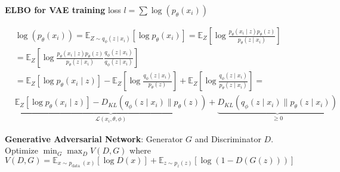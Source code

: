 \textbf{ELBO for VAE training} loss $l=\sum \log \left(p_{\theta}\left(x_{i}\right)\right)$
\begin{tiny}
    \begin{equation*}
        \begin{aligned}
             & \log \left(p_{\theta}\left(x_{i}\right)\right)=\mathbb{E}_{Z \sim q_{\phi}\left(z \mid x_{i}\right)}\left[\log p_{\theta}\left(x_{i}\right)\right] = \mathbb{E}_{Z}\left[\log \frac{p_{\theta}\left(x_{i} \mid z\right) p_{\theta}(z)}{p_{\theta}\left(z \mid x_{i}\right)}\right]                                                                                                                                                                                                                                                                                                                      \\
             & = \mathbb{E}_{Z}\left[\log \frac{p_{\theta}\left(x_{i} \mid z\right) p_{\theta}(z)}{p_{\theta}\left(z \mid x_{i}\right)} \frac{q_{\phi}\left(z \mid x_{i}\right)}{q_{\phi}\left(z \mid x_{i}\right)}\right]                                                                                                                                                                                                                                                                                                                                                                                             \\
             & = \mathbb{E}_{Z}\left[\log p_{\theta}\left(x_{i} \mid z\right)\right] -\mathbb{E}_{Z}\left[\log \frac{q_{\phi}\left(z \mid x_{i}\right)}{p_{\theta}(z)}\right]+\mathbb{E}_{Z}\left[\log \frac{q_{\phi}\left(z \mid x_{i}\right)}{p_{\theta}\left(z \mid x_{i}\right)}\right] = \\
             & \underbrace{\mathbb{E}_{Z}\left[\log p_{\theta}\left(x_{i} \mid z\right)\right]-D_{K L}\left(q_{\phi}\left(z \mid x_{i}\right) \| p_{\theta}(z)\right)}_{\mathcal{L}\left(x_{i}, \theta, \phi\right)}+\underbrace{D_{K L}\left(q_{\phi}\left(z \mid x_{i}\right) \| p_{\theta}\left(z \mid x_{i}\right)\right)}_{\geq 0}
        \end{aligned}
    \end{equation*}
\end{tiny}

\textbf{Generative Adversarial Network}: Generator $G$ and Discriminator $D$. Optimize $\min _{G} \max _{D} V(D, G)$ where $V(D, G) = \mathbb{E}_{x \sim p_{\text {data }}(x)}[\log D(x)]+\mathbb{E}_{z \sim p_{z}(z)}[\log (1-D(G(z)))]$



